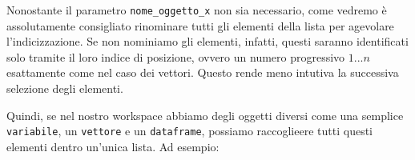 \documentclass[
]{book}
\newenvironment{Shaded}{\begin{snugshade}}{\end{snugshade}}
\newcommand{\CommentTok}[1]{\textcolor[rgb]{0.56,0.35,0.01}{\textit{#1}}}
\newcommand{\DataTypeTok}[1]{\textcolor[rgb]{0.13,0.29,0.53}{#1}}
\newcommand{\DecValTok}[1]{\textcolor[rgb]{0.00,0.00,0.81}{#1}}
\newcommand{\KeywordTok}[1]{\textcolor[rgb]{0.13,0.29,0.53}{\textbf{#1}}}
\newcommand{\NormalTok}[1]{#1}
\newcommand{\OperatorTok}[1]{\textcolor[rgb]{0.81,0.36,0.00}{\textbf{#1}}}
\newcommand{\StringTok}[1]{\textcolor[rgb]{0.31,0.60,0.02}{#1}}
\begin{document}
Nonostante il parametro \texttt{nome\_oggetto\_x} non sia necessario, come vedremo è assolutamente consigliato rinominare tutti gli elementi della lista per agevolare l'indicizzazione. Se non nominiamo gli elementi, infatti, questi saranno identificati solo tramite il loro indice di posizione, ovvero un numero progressivo \(1...n\) esattamente come nel caso dei vettori. Questo rende meno intutiva la successiva selezione degli elementi.

Quindi, se nel nostro workspace abbiamo degli oggetti diversi come una semplice \texttt{variabile}, un \texttt{vettore} e un \texttt{dataframe}, possiamo raccoglieere tutti questi elementi dentro un'unica lista. Ad esempio:

\begin{Shaded}
\end{Shaded}
\end{document}

